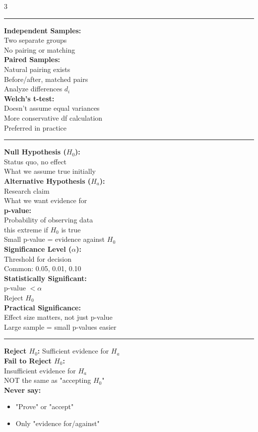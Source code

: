 \documentclass[8pt, letterpaper]{article}
\newcommand{\sectionhead}[1]{%
    \vspace{1.2mm}{\large\bfseries#1}\vspace{0.2mm}\hrule\vspace{0.8mm}%
}
\begin{document}
\begin{multicols}{3}
\sectionhead{Two-Sample Inference}

\textbf{Independent Samples:} \\
Two separate groups \\
No pairing or matching \\[1mm]
\textbf{Paired Samples:} \\
Natural pairing exists \\
Before/after, matched pairs \\
Analyze differences $d_i$ \\[1mm]
\textbf{Welch's t-test:} \\
Doesn't assume equal variances \\
More conservative df calculation \\
Preferred in practice

\sectionhead{Hypothesis Testing}

\textbf{Null Hypothesis ($H_0$):} \\
Status quo, no effect \\
What we assume true initially \\[1mm]
\textbf{Alternative Hypothesis ($H_a$):} \\
Research claim \\
What we want evidence for \\[1mm]
\textbf{p-value:} \\
Probability of observing data \\
this extreme if $H_0$ is true \\
Small p-value = evidence against $H_0$ \\[1mm]
\textbf{Significance Level ($\alpha$):} \\
Threshold for decision \\
Common: 0.05, 0.01, 0.10 \\[1mm]
\textbf{Statistically Significant:} \\
p-value $< \alpha$ \\
Reject $H_0$ \\[1mm]
\textbf{Practical Significance:} \\
Effect size matters, not just p-value \\
Large sample = small p-values easier

\sectionhead{Test Conclusions}

\textbf{Reject $H_0$:}
Sufficient evidence for $H_a$ \\[1mm]
\textbf{Fail to Reject $H_0$:} \\
Insufficient evidence for $H_a$ \\
NOT the same as "accepting $H_0$" \\[1mm]
\textbf{Never say:}
\begin{itemize}
    \item "Prove" or "accept"
    \item Only "evidence for/against"
\end{itemize}


\end{multicols}
\end{document}
